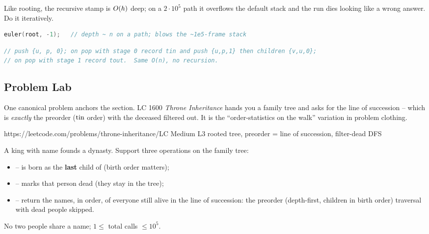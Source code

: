 \begin{warningbox}
Like rooting, the recursive stamp is $O(h)$ deep; on a $2\cdot10^5$ path it overflows the
default stack and the run dies looking like a wrong answer. Do it iteratively.
\end{warningbox}
\begin{lstlisting}[caption={\textcolor{warningred}{WRONG}: recursion on a chain -> RE}, language=C++, basicstyle=\ttfamily\small]
euler(root, -1);   // depth ~ n on a path; blows the ~1e5-frame stack
\end{lstlisting}
\begin{lstlisting}[caption={\textcolor{successgreen}{RIGHT}: explicit stack with an entry/exit stage}, language=C++, basicstyle=\ttfamily\small]
// push {u, p, 0}; on pop with stage 0 record tin and push {u,p,1} then children {v,u,0};
// on pop with stage 1 record tout.  Same O(n), no recursion.
\end{lstlisting}

\subsection{Problem Lab}

One canonical problem anchors the section. LC 1600 \emph{Throne Inheritance} hands you a
family tree and asks for the line of succession -- which is \emph{exactly} the preorder
($\operatorname{tin}$ order) with the deceased filtered out. It is the ``order-statistics on the walk''
variation in problem clothing.

  {https://leetcode.com/problems/throne-inheritance/}{LC Medium L3}
  {rooted tree, preorder = line of succession, filter-dead DFS}

\begin{problemstatement}
A king with name  founds a dynasty. Support three operations on the family
tree:
\begin{itemize}[nosep]
  \item {} --  is born as the
        \textbf{last} child of  (birth order matters);
  \item {} -- marks that person dead (they stay in the tree);
  \item {} -- return the names, in order, of everyone still
        alive in the line of succession: the preorder (depth-first, children in birth order)
        traversal with dead people skipped.
\end{itemize}
No two people share a name; $1 \le$ total calls $\le 10^5$.
\end{problemstatement}

